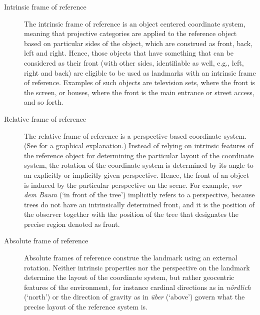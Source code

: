 \begin{description}
\item[Intrinsic frame of reference]
The intrinsic frame of reference is an object centered coordinate 
system, meaning that projective categories are applied to the 
reference object based on particular sides of the object, which 
are construed as front, back, left and right. Hence, those objects 
that have something that can be considered as their front 
(with other sides, identifiable as well, e.g., left, right and back) 
are eligible to be used as landmarks with an intrinsic frame of 
reference. Examples of such objects are television sets, where 
the front is the screen, or houses, where the front is the main 
entrance or street access, and so forth.
\item[Relative frame of reference]
The relative frame of reference is a perspective based coordinate 
system. (See  for a graphical 
explanation.) Instead of relying on intrinsic features of the 
reference object for determining the particular layout of the 
coordinate system, the rotation of the coordinate system is 
determined by its angle to an explicitly or implicitly given 
perspective. Hence, the front of an object is induced by the\enlargethispage{1\baselineskip} 
particular perspective on the scene. For example, \textit{vor dem 
Baum} (`in front of the tree') implicitly refers to a perspective, 
because trees do not have an intrinsically determined front, and 
it is the position of the observer together with the position of the 
tree that designates the precise region denoted as front.
\item[Absolute frame of reference] Absolute frames of reference construe 
the landmark using an external rotation. Neither intrinsic 
properties nor the perspective on the landmark determine the layout 
of the coordinate system, but rather geocentric features of the 
environment, for instance cardinal directions as in 
\textit{n\"ordlich} (`north') or the direction of gravity as in \textit{\"uber} (`above')
govern what the precise layout of the reference system is.
\end{description} 

